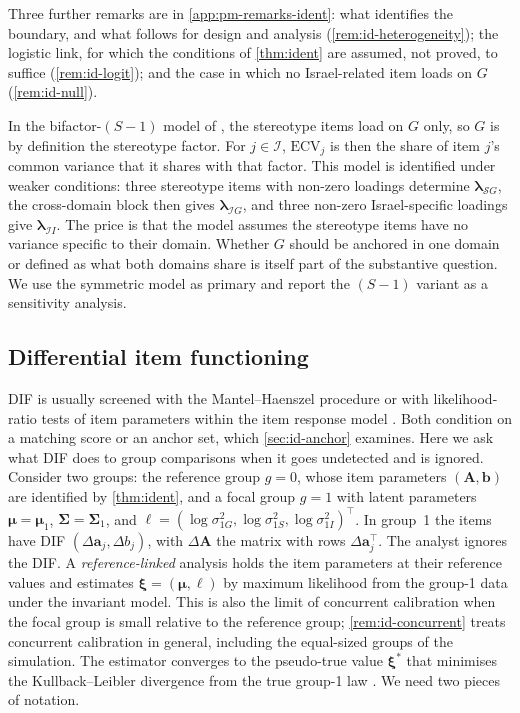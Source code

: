 Three further remarks are in \cref{app:pm-remarks-ident}: what identifies the boundary, and what follows for design and analysis (\cref{rem:id-heterogeneity}); the logistic link, for which the conditions of \cref{thm:ident} are assumed, not proved, to suffice (\cref{rem:id-logit}); and the case in which no Israel-related item loads on $G$ (\cref{rem:id-null}).

\begin{remark}\label{rem:id-s1}
In the bifactor-$(S-1)$ model of \citet{eid2017}, the stereotype items load on $G$ only, so $G$ is by definition the stereotype factor. For $j\in\mathcal I$, $\mathrm{ECV}_j$ is then the share of item $j$'s common variance that it shares with that factor. This model is identified under weaker conditions: three stereotype items with non-zero loadings determine $\bm\lambda_{\mathcal SG}$, the cross-domain block then gives $\bm\lambda_{\mathcal IG}$, and three non-zero Israel-specific loadings give $\bm\lambda_{\mathcal II}$. The price is that the model assumes the stereotype items have no variance specific to their domain. Whether $G$ should be anchored in one domain or defined as what both domains share is itself part of the substantive question. We use the symmetric model as primary and report the $(S-1)$ variant as a sensitivity analysis.
\end{remark}

\subsection{Differential item functioning}\label{sec:id-dif}

DIF is usually screened with the Mantel--Haenszel procedure \citep{holland1988} or with likelihood-ratio tests of item parameters within the item response model \citep{thissen1993}. Both condition on a matching score or an anchor set, which \cref{sec:id-anchor} examines. Here we ask what DIF does to group comparisons when it goes undetected and is ignored. Consider two groups: the reference group $g=0$, whose item parameters $(\bm A,\bm b)$ are identified by \cref{thm:ident}, and a focal group $g=1$ with latent parameters $\bm\mu=\bm\mu_1$, $\bm\Sigma=\bm\Sigma_1$, and $\bm\ell=(\log\sigma^2_{1G},\log\sigma^2_{1S},\log\sigma^2_{1I})^\top$. In group~1 the items have DIF $(\Delta\bm a_j,\Delta b_j)$, with $\Delta\bm A$ the matrix with rows $\Delta\bm a_j^\top$. The analyst ignores the DIF. A \emph{reference-linked} analysis holds the item parameters at their reference values and estimates $\bm\xi=(\bm\mu,\bm\ell)$ by maximum likelihood from the group-1 data under the invariant model. This is also the limit of concurrent calibration when the focal group is small relative to the reference group; \cref{rem:id-concurrent} treats concurrent calibration in general, including the equal-sized groups of the simulation. The estimator converges to the pseudo-true value $\bm\xi^*$ that minimises the Kullback--Leibler divergence from the true group-1 law \citep{white1982}. We need two pieces of notation.

